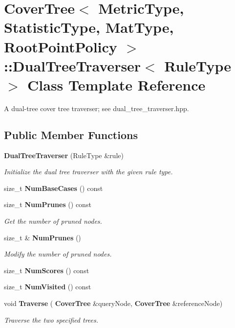 \section{Cover\+Tree$<$ Metric\+Type, Statistic\+Type, Mat\+Type, Root\+Point\+Policy $>$\+:\+:Dual\+Tree\+Traverser$<$ Rule\+Type $>$ Class Template Reference}
\label{classmlpack_1_1tree_1_1CoverTree_1_1DualTreeTraverser}


A dual-\/tree cover tree traverser; see dual\+\_\+tree\+\_\+traverser.\+hpp.  


\subsection*{Public Member Functions}
\begin{DoxyCompactItemize}
\item 
\textbf{ Dual\+Tree\+Traverser} (Rule\+Type \&rule)
\begin{DoxyCompactList}\small\item\em Initialize the dual tree traverser with the given rule type. \end{DoxyCompactList}\item 
size\+\_\+t \textbf{ Num\+Base\+Cases} () const
\item 
size\+\_\+t \textbf{ Num\+Prunes} () const
\begin{DoxyCompactList}\small\item\em Get the number of pruned nodes. \end{DoxyCompactList}\item 
size\+\_\+t \& \textbf{ Num\+Prunes} ()
\begin{DoxyCompactList}\small\item\em Modify the number of pruned nodes. \end{DoxyCompactList}\item 
size\+\_\+t \textbf{ Num\+Scores} () const
\item 
size\+\_\+t \textbf{ Num\+Visited} () const
\item 
void \textbf{ Traverse} (\textbf{ Cover\+Tree} \&query\+Node, \textbf{ Cover\+Tree} \&reference\+Node)
\begin{DoxyCompactList}\small\item\em Traverse the two specified trees. \end{DoxyCompactList}\end{DoxyCompactItemize}


